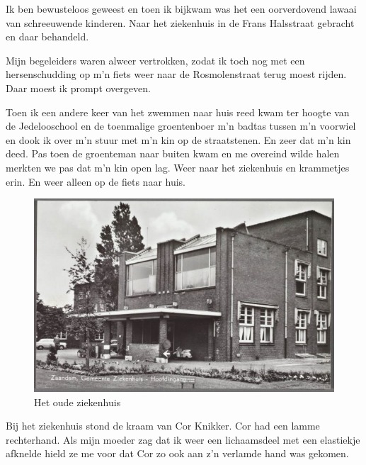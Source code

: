 \documentclass[10pt,twoside, openright]{memoir}
\begin{document}
Ik ben bewusteloos geweest en toen ik bijkwam was het een oorverdovend lawaai van schreeuwende kinderen. Naar het ziekenhuis in de Frans Halsstraat gebracht en daar behandeld.

Mijn begeleiders waren alweer vertrokken, zodat ik toch nog met een hersenschudding op m’n fiets weer naar de Rosmolenstraat terug moest rijden. Daar moest ik prompt overgeven. 


Toen ik een andere keer van het zwemmen naar huis reed kwam ter hoogte van de Jedelooschool en de toenmalige groentenboer m’n badtas tussen m’n voorwiel en dook ik over m’n stuur met m’n kin op de straatstenen. En zeer dat m’n kin deed. Pas toen de groenteman naar buiten kwam en me overeind wilde halen merkten we pas dat m’n kin open lag. Weer naar het ziekenhuis en krammetjes erin. En weer alleen op de fiets naar huis.

\begin{figure}
\includegraphics[width=\textwidth]{img/80ZiekenhuisFrHallstr}
\caption*{\footnotesize Het oude ziekenhuis}
\end{figure}

Bij het ziekenhuis stond de kraam van Cor Knikker. Cor had een lamme rechterhand. Als mijn moeder zag dat ik weer een lichaamsdeel met een elastiekje afknelde hield ze me voor dat Cor zo ook aan z’n verlamde hand was gekomen.
\end{document}
